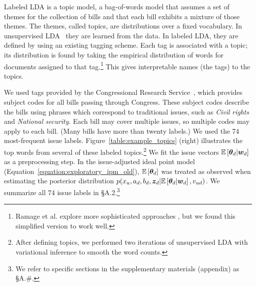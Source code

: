 Labeled LDA is a topic model, a bag-of-words model that assumes a set
of themes for the collection of bills and that each bill exhibits a
mixture of those themes.  The themes, called topics, are distributions
over a fixed vocabulary.  In unsupervised LDA~\cite{blei:2003} they
are learned from the data.  In labeled LDA, they are defined by using
an existing tagging scheme.  Each tag is associated with a topic; its
distribution is found by taking the empirical distribution of words
for documents assigned to that tag.\footnote{Ramage et al.  explore
  more sophisticated approaches \cite{ramage:2009}, but we found this
  simplified version to work well.}  This gives
interpretable names (the tags) to the topics.

We used tags provided by the Congressional Research
Service~\cite{crs:2011}, which provides subject codes for all bills
passing through Congress.  These subject codes describe the bills
using phrases which correspond to traditional issues, such as
\emph{Civil rights} and \emph{National security}. Each bill may cover
multiple issues, so multiple codes may apply to each bill. (Many bills
have more than twenty labels.)  We used the 74 most-frequent issue
labels. Figure~\ref{table:example_topics} (right) illustrates the top
words from several of these labeled topics.\footnote{After defining
  topics, we performed two iterations of unsupervised LDA with
  variational inference to smooth the word counts.} We fit the issue
vectors $\mathbb{E}\left[\bm \theta_d | \bm w_d\right]$ as a preprocessing step.  In
the issue-adjusted ideal point model
(Equation~\ref{equation:exploratory_ipm_old}), $\mathbb{E}\left[\bm \theta_d\right]$
was treated as observed when estimating the posterior distribution
$p(x_u, a_d, b_d, \bm z_d | \mathbb{E}\left[\bm \theta_d | \bm w_d\right],
v_{ud})$. We summarize all 74 issue labels in \S A.2.\footnote{We refer
  to specific sections in the supplementary materials (appendix) as \S A.\#.}



